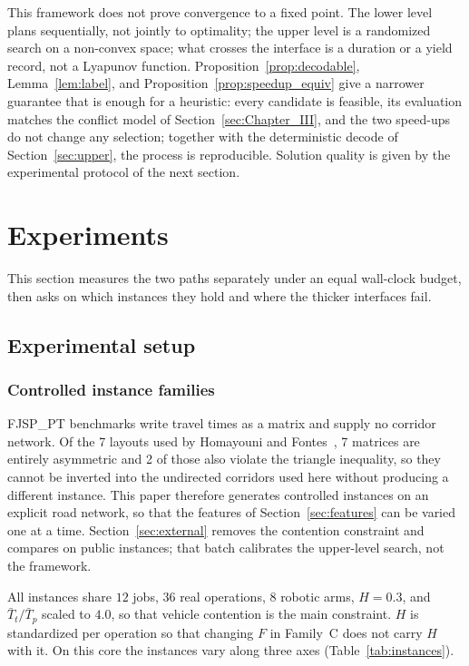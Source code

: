 \documentclass[manuscript,screen,review]{acmart}
\newcommand{\PubNLayout}{7}
\newcommand{\PubNLayoutAsym}{7}           %
\newcommand{\PubNLayoutBad}{2}            %
\begin{document}
This framework does not prove convergence to a fixed point.
The lower level plans sequentially, not jointly to optimality; the upper level is a randomized search on a non-convex space; what crosses the interface is a duration or a yield record, not a Lyapunov function.
Proposition~\ref{prop:decodable}, Lemma~\ref{lem:label}, and Proposition~\ref{prop:speedup_equiv} give a narrower guarantee that is enough for a heuristic: every candidate is feasible, its evaluation matches the conflict model of Section~\ref{sec:Chapter_III}, and the two speed-ups do not change any selection; together with the deterministic decode of Section~\ref{sec:upper}, the process is reproducible.
Solution quality is given by the experimental protocol of the next section.

\section{Experiments}
\label{sec:Chapter_V}

This section measures the two paths separately under an equal wall-clock budget, then asks on which instances they hold and where the thicker interfaces fail.

\subsection{Experimental setup}
\label{sec:instances}

\subsubsection{Controlled instance families}
FJSP\_PT benchmarks write travel times as a matrix and supply no corridor network.
Of the \PubNLayout{} layouts used by Homayouni and Fontes~\cite{homayouni2021production},
\PubNLayoutAsym{} matrices are entirely asymmetric and \PubNLayoutBad{} of those also violate the triangle inequality, so they cannot be inverted into the undirected corridors used here without producing a different instance.
This paper therefore generates controlled instances on an explicit road network, so that the features of Section~\ref{sec:features} can be varied one at a time.
Section~\ref{sec:external} removes the contention constraint and compares on public instances; that batch calibrates the upper-level search, not the framework.

All instances share $12$ jobs, $36$ real operations, $8$ robotic arms, $H=0.3$, and $\bar{T}_t/\bar{T}_p$ scaled to $4.0$, so that vehicle contention is the main constraint.
$H$ is standardized per operation so that changing $F$ in Family~C does not carry $H$ with it.
On this core the instances vary along three axes (Table~\ref{tab:instances}).
\end{document}
